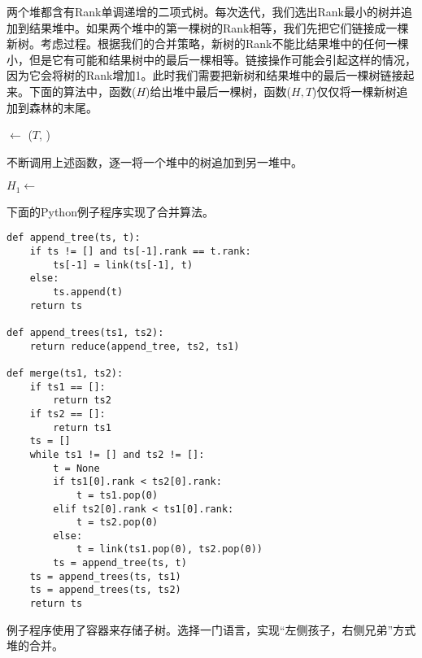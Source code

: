 \documentclass{ctexart}
\begin{document}
两个堆都含有Rank单调递增的二项式树。每次迭代，我们选出Rank最小的树并追加到结果堆中。如果两个堆中的第一棵树的Rank相等，我们先把它们链接成一棵新树。考虑过程。根据我们的合并策略，新树的Rank不能比结果堆中的任何一棵小，但是它有可能和结果树中的最后一棵相等。链接操作可能会引起这样的情况，因为它会将树的Rank增加1。此时我们需要把新树和结果堆中的最后一棵树链接起来。下面的算法中，函数($H$)给出堆中最后一棵树，函数($H, T$)仅仅将一棵新树追加到森林的末尾。

\begin{algorithmic}[1]
    \State {} $\gets$ ($T$, )
  \Else
    \State {}
  \EndIf
\EndFunction
\end{algorithmic}

不断调用上述函数，逐一将一个堆中的树追加到另一堆中。

\begin{algorithmic}[1]
    \State $H_1 \gets $ 
  \EndFor
\EndFunction
\end{algorithmic}

下面的Python例子程序实现了合并算法。

\lstset{language=Python}
\begin{lstlisting}
def append_tree(ts, t):
    if ts != [] and ts[-1].rank == t.rank:
        ts[-1] = link(ts[-1], t)
    else:
        ts.append(t)
    return ts

def append_trees(ts1, ts2):
    return reduce(append_tree, ts2, ts1)

def merge(ts1, ts2):
    if ts1 == []:
        return ts2
    if ts2 == []:
        return ts1
    ts = []
    while ts1 != [] and ts2 != []:
        t = None
        if ts1[0].rank < ts2[0].rank:
            t = ts1.pop(0)
        elif ts2[0].rank < ts1[0].rank:
            t = ts2.pop(0)
        else:
            t = link(ts1.pop(0), ts2.pop(0))
        ts = append_tree(ts, t)
    ts = append_trees(ts, ts1)
    ts = append_trees(ts, ts2)
    return ts
\end{lstlisting}

\begin{Exercise}

例子程序使用了容器来存储子树。选择一门语言，实现“左侧孩子，右侧兄弟”方式堆的合并。

\end{Exercise}
\end{document}

